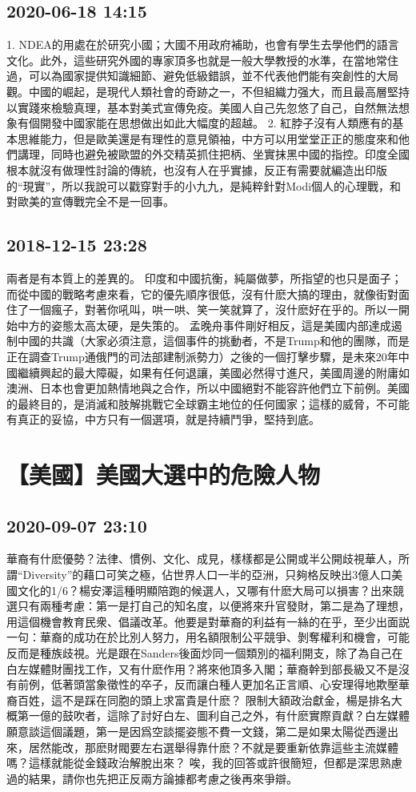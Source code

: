 \documentclass[twocolumn]{ctexart}
\begin{document}
\subsection*{2020-06-18 14:15}

1. NDEA的用處在於研究小國；大國不用政府補助，也會有學生去學他們的語言文化。此外，這些研究外國的專家頂多也就是一般大學教授的水準，在當地常住過，可以為國家提供知識細節、避免低級錯誤，並不代表他們能有突創性的大局觀。中國的崛起，是現代人類社會的奇跡之一，不但組織力强大，而且最高層堅持以實踐來檢驗真理，基本對美式宣傳免疫。美國人自己先忽悠了自己，自然無法想象有個開發中國家能在思想做出如此大幅度的超越。
2. 紅脖子沒有人類應有的基本思維能力，但是歐美還是有理性的意見領袖，中方可以用堂堂正正的態度來和他們講理，同時也避免被歐盟的外交精英抓住把柄、坐實抹黑中國的指控。印度全國根本就沒有做理性討論的傳統，也沒有人在乎實據，反正有需要就編造出印版的“現實”，所以我說可以戳穿對手的小九九，是純粹針對Modi個人的心理戰，和對歐美的宣傳戰完全不是一回事。
\subsection*{2018-12-15 23:28}

兩者是有本質上的差異的。 
印度和中國抗衡，純屬做夢，所指望的也只是面子；而從中國的戰略考慮來看，它的優先順序很低，沒有什麽大搞的理由，就像街對面住了一個瘋子，對著你吼叫，哄一哄、笑一笑就算了，沒什麽好在乎的。所以一開始中方的姿態太高太硬，是失策的。 
孟晚舟事件剛好相反，這是美國内部達成遏制中國的共識（大家必須注意，這個事件的挑動者，不是Trump和他的團隊，而是正在調查Trump通俄門的司法部建制派勢力）之後的一個打擊步驟，是未來20年中國繼續興起的最大障礙，如果有任何退讓，美國必然得寸進尺，美國周邊的附庸如澳洲、日本也會更加熱情地與之合作，所以中國絕對不能容許他們立下前例。美國的最終目的，是消滅和肢解挑戰它全球霸主地位的任何國家；這樣的威脅，不可能有真正的妥協，中方只有一個選項，就是持續鬥爭，堅持到底。
\section*{【美國】美國大選中的危險人物}
\subsection*{2020-09-07 23:10}

華裔有什麽優勢？法律、慣例、文化、成見，樣樣都是公開或半公開歧視華人，所謂“Diversity”的藉口可笑之極，佔世界人口一半的亞洲，只夠格反映出3億人口美國文化的1/6？楊安澤這種明顯陪跑的候選人，又哪有什麽大局可以損害？出來競選只有兩種考慮：第一是打自己的知名度，以便將來升官發財，第二是為了理想，用這個機會教育民衆、倡議改革。他要是對華裔的利益有一絲的在乎，至少出面説一句：華裔的成功在於比別人努力，用名額限制公平競爭、剝奪權利和機會，可能反而是種族歧視。光是跟在Sanders後面炒同一個類別的福利開支，除了為自己在白左媒體財團找工作，又有什麽作用？將來他頂多入閣；華裔幹到部長級又不是沒有前例，低著頭當象徵性的卒子，反而讓白種人更加名正言順、心安理得地欺壓華裔百姓，這不是踩在同胞的頭上求富貴是什麽？
限制大額政治獻金，楊是排名大概第一億的鼓吹者，這除了討好白左、圖利自己之外，有什麽實際貢獻？白左媒體願意談這個議題，第一是因爲空談擺姿態不費一文錢，第二是如果太陽從西邊出來，居然能改，那麽財閥要左右選舉得靠什麽？不就是要重新依靠這些主流媒體嗎？這樣就能從金錢政治解脫出來？
唉，我的回答或許很簡短，但都是深思熟慮過的結果，請你也先把正反兩方論據都考慮之後再來爭辯。
\end{document}
